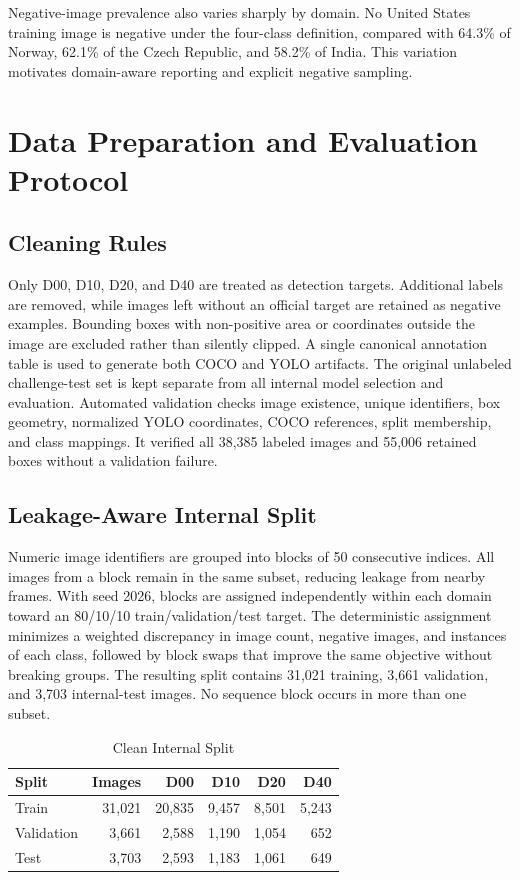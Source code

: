 \documentclass[conference]{ieee-template/vendor/IEEEtran/IEEEtran}
\begin{document}
Negative-image prevalence also varies sharply by domain. No United States
training image is negative under the four-class definition, compared with
64.3\% of Norway, 62.1\% of the Czech Republic, and 58.2\% of India. This
variation motivates domain-aware reporting and explicit negative sampling.

\section{Data Preparation and Evaluation Protocol}
\label{sec:protocol}

\subsection{Cleaning Rules}
Only D00, D10, D20, and D40 are treated as detection targets. Additional labels
are removed, while images left without an official target are retained as
negative examples. Bounding boxes with non-positive area or coordinates outside
the image are excluded rather than silently clipped. A single canonical
annotation table is used to generate both COCO and YOLO artifacts. The original
unlabeled challenge-test set is kept separate from all internal model selection
and evaluation. Automated validation checks image existence, unique identifiers,
box geometry, normalized YOLO coordinates, COCO references, split membership,
and class mappings. It verified all 38,385 labeled images and 55,006 retained
boxes without a validation failure.

\subsection{Leakage-Aware Internal Split}
Numeric image identifiers are grouped into blocks of 50 consecutive indices.
All images from a block remain in the same subset, reducing leakage from nearby
frames. With seed 2026, blocks are assigned independently within each domain
toward an 80/10/10 train/validation/test target. The deterministic assignment
minimizes a weighted discrepancy in image count, negative images, and instances
of each class, followed by block swaps that improve the same objective without
breaking groups. The resulting split contains 31,021 training, 3,661
validation, and 3,703 internal-test images. No sequence block occurs in more
than one subset.

\begin{table}[t]
    \caption{Clean Internal Split}
    \label{tab:internal-split}
    \centering
    \begin{tabular}{lrrrrr}
        \toprule
        Split & Images & D00 & D10 & D20 & D40 \\
        \midrule
        Train & 31,021 & 20,835 & 9,457 & 8,501 & 5,243 \\
        Validation & 3,661 & 2,588 & 1,190 & 1,054 & 652 \\
        Test & 3,703 & 2,593 & 1,183 & 1,061 & 649 \\
        \bottomrule
    \end{tabular}
\end{table}
\end{document}
